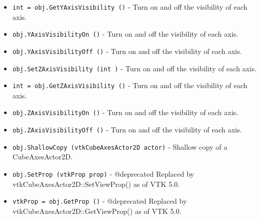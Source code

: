 \begin{itemize}
\item  \verb|int = obj.GetYAxisVisibility ()| -  Turn on and off the visibility of each axis.

\item  \verb|obj.YAxisVisibilityOn ()| -  Turn on and off the visibility of each axis.

\item  \verb|obj.YAxisVisibilityOff ()| -  Turn on and off the visibility of each axis.

\item  \verb|obj.SetZAxisVisibility (int )| -  Turn on and off the visibility of each axis.

\item  \verb|int = obj.GetZAxisVisibility ()| -  Turn on and off the visibility of each axis.

\item  \verb|obj.ZAxisVisibilityOn ()| -  Turn on and off the visibility of each axis.

\item  \verb|obj.ZAxisVisibilityOff ()| -  Turn on and off the visibility of each axis.

\item  \verb|obj.ShallowCopy (vtkCubeAxesActor2D actor)| -  Shallow copy of a CubeAxesActor2D.

\item  \verb|obj.SetProp (vtkProp prop)| -  @deprecated Replaced by vtkCubeAxesActor2D::SetViewProp() as of VTK 5.0.

\item  \verb|vtkProp = obj.GetProp ()| -  @deprecated Replaced by vtkCubeAxesActor2D::GetViewProp() as of VTK 5.0.

\end{itemize}
